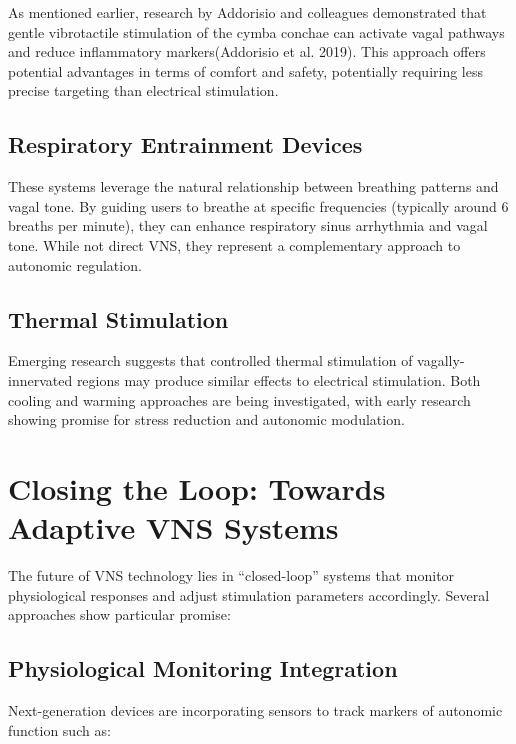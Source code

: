 \documentclass[
  Letterpaper,
]{scrbook}
\begin{document}
As mentioned earlier, research by Addorisio and colleagues demonstrated
that gentle vibrotactile stimulation of the cymba conchae can activate
vagal pathways and reduce inflammatory markers(Addorisio et al. 2019).
This approach offers potential advantages in terms of comfort and
safety, potentially requiring less precise targeting than electrical
stimulation.

\subsection{Respiratory Entrainment
Devices}\label{respiratory-entrainment-devices}

These systems leverage the natural relationship between breathing
patterns and vagal tone. By guiding users to breathe at specific
frequencies (typically around 6 breaths per minute), they can enhance
respiratory sinus arrhythmia and vagal tone. While not direct VNS, they
represent a complementary approach to autonomic regulation.

\subsection{Thermal Stimulation}\label{thermal-stimulation}

Emerging research suggests that controlled thermal stimulation of
vagally-innervated regions may produce similar effects to electrical
stimulation. Both cooling and warming approaches are being investigated,
with early research showing promise for stress reduction and autonomic
modulation.

\section{Closing the Loop: Towards Adaptive VNS
Systems}\label{closing-the-loop-towards-adaptive-vns-systems}

The future of VNS technology lies in ``closed-loop'' systems that
monitor physiological responses and adjust stimulation parameters
accordingly. Several approaches show particular promise:

\subsection{Physiological Monitoring
Integration}\label{physiological-monitoring-integration}

Next-generation devices are incorporating sensors to track markers of
autonomic function such as:
\end{document}
